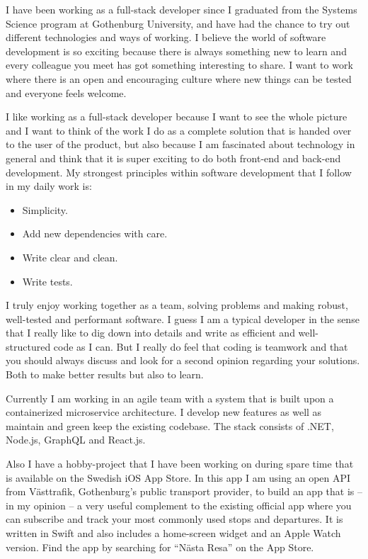 

I have been working as a full-stack developer since I graduated from the Systems Science program at
Gothenburg University, and have had the chance to try out different technologies and ways
of working. I believe the world of software development is so exciting because there is always something new
to learn and every colleague you meet has got something interesting to share. I want to work where there is an
open and encouraging culture where new things can be tested and everyone feels welcome.

I like working as a full-stack developer because I want to see the whole picture and I want to think of the work
I do as a complete solution that is handed over to the user of the product, but also because I am
fascinated about technology in general and think that it is super exciting to do both front-end and
back-end development. My strongest principles within software development that I follow in my daily work is:

\begin{itemize}
  \item Simplicity.
  \item Add new dependencies with care.
  \item Write clear and clean.
  \item Write tests.
\end{itemize}

I truly enjoy working together as a team, solving problems and making robust, well-tested and
performant software. I guess I am a typical developer in the sense that I really like
to dig down into details and write as efficient and well-structured code as I can. But I really do feel that coding
is teamwork and that you should always discuss and look for a second opinion regarding your solutions.
Both to make better results but also to learn.

Currently I am working in an agile team with a system that is built upon a containerized microservice architecture.
I develop new features as well as maintain and green keep the existing codebase.
The stack consists of .NET, Node.js, GraphQL and React.js.

Also I have a hobby-project that I have been working on during spare time that is available
on the Swedish iOS App Store. In this app I am using an open API from Västtrafik, Gothenburg’s public
transport provider, to build an app that is – in my opinion – a very useful complement to the
existing official app where you can subscribe and track your most commonly used stops and departures.
It is written in Swift and also includes a home-screen widget and an Apple Watch version. Find
the app by searching for “Nästa Resa” on the App Store.

